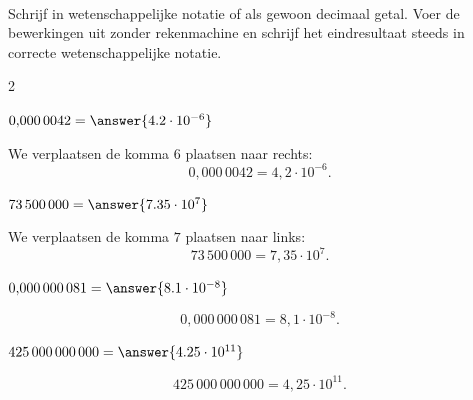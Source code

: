 \documentclass{ximera}
\begin{document}
        \begin{oefening}{\oefB\ESS}
            \\
            
            Schrijf in wetenschappelijke notatie of als gewoon decimaal getal.
            Voer de bewerkingen uit zonder rekenmachine en schrijf het eindresultaat steeds in correcte wetenschappelijke notatie.
            
            \begin{multicols}{2}
            
            \begin{question}
            $0{,}000\,0042=\answer{4.2\cdot10^{-6}}$
            
            \begin{oplossing}
            We verplaatsen de komma $6$ plaatsen naar rechts:
            \[
            0{,}000\,0042
            =4{,}2\cdot10^{-6}.
            \]
            \end{oplossing}
            \end{question}
            
            
            \begin{question}
            $73\,500\,000=\answer{7.35\cdot10^7}$
            
            \begin{oplossing}
            We verplaatsen de komma $7$ plaatsen naar links:
            \[
            73\,500\,000
            =7{,}35\cdot10^7.
            \]
            \end{oplossing}
            \end{question}
            
            
            \begin{question}
            $0{,}000\,000\,081
            =\answer{8.1\cdot10^{-8}}$
            
            \begin{oplossing}
            \[
            0{,}000\,000\,081
            =8{,}1\cdot10^{-8}.
            \]
            \end{oplossing}
            \end{question}
            
            
            \begin{question}
            $425\,000\,000\,000
            =\answer{4.25\cdot10^{11}}$
            
            \begin{oplossing}
            \[
            425\,000\,000\,000
            =4{,}25\cdot10^{11}.
            \]
            \end{oplossing}
            \end{question}
            

\end{multicols}
\end{oefening}
\end{document}
